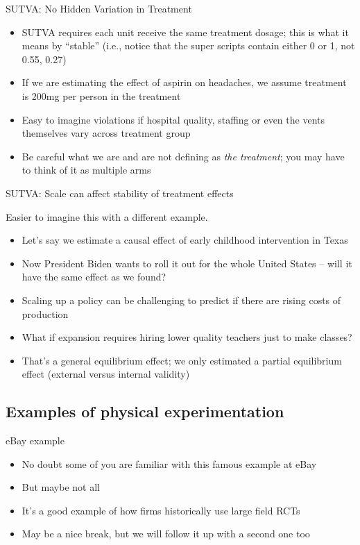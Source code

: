\documentclass{beamer}
\begin{document}
\begin{frame}{SUTVA: No Hidden Variation in Treatment}

  \begin{itemize}
    \item SUTVA requires each unit receive the same treatment dosage; this is what it means by ``stable'' (i.e., notice that the super scripts contain either 0 or 1, not 0.55, 0.27)
    \item If we are estimating the effect of aspirin on headaches, we assume treatment is 200mg per person in the treatment
    \item Easy to imagine violations if hospital quality, staffing or even the vents themselves vary across treatment group
    \item Be careful what we are and are not defining as \emph{the treatment}; you may have to think of it as multiple arms
  \end{itemize}
\end{frame}

\begin{frame}{SUTVA: Scale can affect stability of treatment effects}

  Easier to imagine this with a different example.
  \begin{itemize}
    \item Let's say we estimate a causal effect of early childhood intervention in Texas
    \item Now President Biden wants to roll it out for the whole United States -- will it have the same effect as we found?
    \item Scaling up a policy can be challenging to predict if there are rising costs of production
    \item What if expansion requires hiring lower quality teachers just to make classes?
    \item That's a general equilibrium effect; we only estimated a partial equilibrium effect (external versus internal validity)
  \end{itemize}
\end{frame}
% 

\subsection{Examples of physical experimentation}

\begin{frame}{eBay example}

\begin{itemize}
\item No doubt some of you are familiar with this famous example at eBay
\item But maybe not all
\item It's a good example of how firms historically use large field RCTs
\item May be a nice break, but we will follow it up with a second one too
\end{itemize}

\end{frame}
\end{document}
